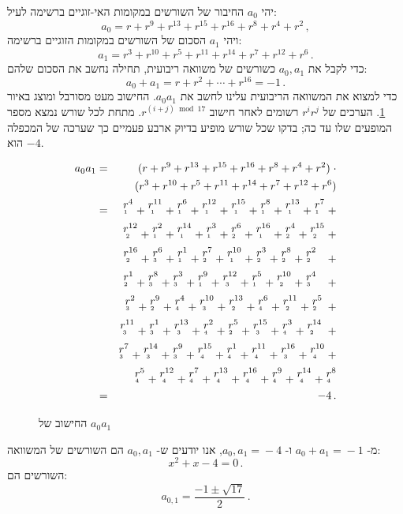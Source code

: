 יהי
$a_0$
החיבור של השורשים במקומות האי-זוגיים ברשימה לעיל:
\[
a_0=r + r^9 + r^{13} +r^{15} +r^{16} + r^8+r^4+r^2\,,
\]
ויהי
$a_1$
הסכום של השורשים במקומות הזוגיים ברשימה:
\[
a_1=r^3 + r^{10} + r^{5} +r^{11} +r^{14} + r^7+r^{12}+r^6\,.
\]
כדי לקבל את
$a_0,a_1$
כשורשים של משוואה ריבועית, תחילה נחשב את הסכום שלהם:
\[
a_0+a_1=r + r^2 + \cdots +r^{16}=-1\,.
\]
כדי למצוא את המשוואה הריבועית עלינו לחשב את
$a_0a_1$.
החישוב מעט מסורבל ומוצג באיור%
~\ref{fig.a0a1}.
הערכים של
$r^ir^j$
רשומים לאחר חישוב
$r^{(i+j) \bmod 17}$.
מתחת לכל שורש נמצא מספר המופעים שלו עד כה;
בדקו שכל שורש מופיע בדיוק ארבע פעמיים כך שערכה של המכפלה הוא 
$-4$.
\begin{figure}[tb]
\begin{eqnarray*}
a_0a_1&=&(r + r^9 + r^{13} +r^{15} +r^{16} + r^8+r^4+r^2)\;\cdot\\
&&(r^3 + r^{10} + r^{5} +r^{11} +r^{14} + r^7+r^{12}+r^6)\\
&=&\occ{4}{1} + \occ{11}{1} + \occ{6}{1} + \occ{12}{1} + \occ{15}{1} + \occ{8}{1} + \occ{13}{1} + \occ{7}{1} +\\
&&\occ{12}{2} + \occ{2}{1} + \occ{14}{1} + \occ{3}{1} + \occ{6}{2} + \occ{16}{1} + \occ{4}{2} + \occ{15}{2} +\\
&&\occ{16}{2} + \occ{6}{3} + \occ{1}{1} + \occ{7}{2} + \occ{10}{1} + \occ{3}{2} + \occ{8}{2} + \occ{2}{2}\;\;\: +\\
&&\occ{1}{2} + \occ{8}{3} + \occ{3}{3} + \occ{9}{1} + \occ{12}{3} + \occ{5}{1} + \occ{10}{2} + \occ{4}{3}\;\;\: +\\
&&\occ{2}{3} + \occ{9}{2} + \occ{4}{4} + \occ{10}{3} + \occ{13}{2} + \occ{6}{4} + \occ{11}{2} + \occ{5}{2} \:+\\
&&\occ{11}{3} + \occ{1}{3} + \occ{13}{3} + \occ{2}{4} + \occ{5}{2} + \occ{15}{3} + \occ{3}{4} + \occ{14}{2} \;+\\
&&\occ{7}{3} + \occ{14}{3} + \occ{9}{3} + \occ{15}{4} + \occ{1}{4} + \occ{11}{4} + \occ{16}{3} + \occ{10}{4} +\\
&&\occ{5}{4} + \occ{12}{4} + \occ{7}{4} + \occ{13}{4} + \occ{16}{4} + \occ{9}{4} + \occ{14}{4} + \occ{8}{4}\\
&=&-4\,.
\end{eqnarray*}
\caption{החישוב של $a_0a_1$}\label{fig.a0a1}
\end{figure}

מ-%
$a_0\!+\!a_1\!=\!-1$
ו-%
$a_0,a_1\!=\!-4$,
אנו יודעים ש-%
$a_0,a_1$
הם השורשים של המשוואה:
\[
x^2+x-4=0\,.
\]
השורשים הם:
\[
a_{0,1} = \frac{-1\pm\sqrt{17}}{2}\,.
\]



